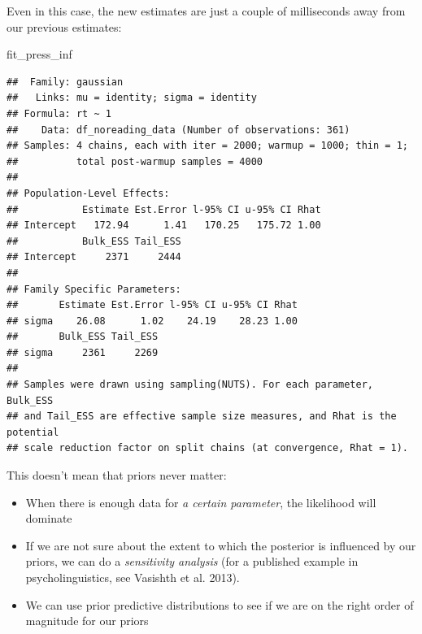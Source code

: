 \documentclass[12pt,ignorenonframetext,aspectratio=169]{beamer}
\newenvironment{Shaded}{\begin{snugshade}}{\end{snugshade}}
\newcommand{\NormalTok}[1]{#1}
\providecommand{\tightlist}{%
  \setlength{\itemsep}{0pt}\setlength{\parskip}{0pt}}
\begin{document}
\begin{frame}[fragile]

Even in this case, the new estimates are just a couple of milliseconds away from our previous estimates:

\scriptsize

\begin{Shaded}
\begin{Highlighting}[]
\NormalTok{fit_press_inf}
\end{Highlighting}
\end{Shaded}

\begin{verbatim}
##  Family: gaussian 
##   Links: mu = identity; sigma = identity 
## Formula: rt ~ 1 
##    Data: df_noreading_data (Number of observations: 361) 
## Samples: 4 chains, each with iter = 2000; warmup = 1000; thin = 1;
##          total post-warmup samples = 4000
## 
## Population-Level Effects: 
##           Estimate Est.Error l-95% CI u-95% CI Rhat
## Intercept   172.94      1.41   170.25   175.72 1.00
##           Bulk_ESS Tail_ESS
## Intercept     2371     2444
## 
## Family Specific Parameters: 
##       Estimate Est.Error l-95% CI u-95% CI Rhat
## sigma    26.08      1.02    24.19    28.23 1.00
##       Bulk_ESS Tail_ESS
## sigma     2361     2269
## 
## Samples were drawn using sampling(NUTS). For each parameter, Bulk_ESS
## and Tail_ESS are effective sample size measures, and Rhat is the potential
## scale reduction factor on split chains (at convergence, Rhat = 1).
\end{verbatim}

\normalsize

\end{frame}

\begin{frame}

This doesn't mean that priors never matter:

\begin{itemize}
\tightlist
\item
  When there is enough data for \emph{a certain parameter}, the likelihood will dominate
\item
  If we are not sure about the extent to which the posterior is influenced by our priors, we can do a \emph{sensitivity analysis} (for a published example in psycholinguistics, see Vasishth et al. 2013).
\item
  We can use prior predictive distributions to see if we are on the right order of magnitude for our priors
\end{itemize}

\end{frame}
\end{document}
